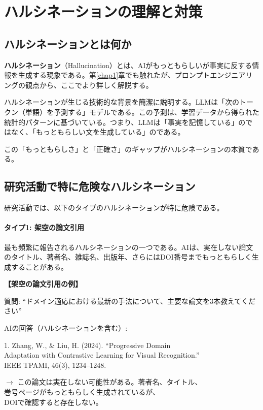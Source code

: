\section{ハルシネーションの理解と対策}
\label{sec:2.5}

\subsection{ハルシネーションとは何か}

\textbf{ハルシネーション}（Hallucination）とは、AIがもっともらしいが事実に反する情報を生成する現象である。第\ref{chap1}章でも触れたが、プロンプトエンジニアリングの観点から、ここでより詳しく解説する。

ハルシネーションが生じる技術的な背景を簡潔に説明する。LLMは「次のトークン（単語）を予測する」モデルである。この予測は、学習データから得られた統計的パターンに基づいている。つまり、LLMは「事実を記憶している」のではなく、「もっともらしい文を生成している」のである。

この「もっともらしさ」と「正確さ」のギャップがハルシネーションの本質である。

\subsection{研究活動で特に危険なハルシネーション}

研究活動では、以下のタイプのハルシネーションが特に危険である。

\paragraph{タイプ1: 架空の論文引用}
最も頻繁に報告されるハルシネーションの一つである。AIは、実在しない論文のタイトル、著者名、雑誌名、出版年、さらにはDOI番号までもっともらしく生成することがある。

\begin{promptbox}
\textbf{【架空の論文引用の例】}

質問: ``ドメイン適応における最新の手法について、主要な論文を3本教えてください''

AIの回答（ハルシネーションを含む）:

1. Zhang, W., \& Liu, H. (2024). ``Progressive Domain\\
Adaptation with Contrastive Learning for Visual Recognition.''\\
IEEE TPAMI, 46(3), 1234--1248.

$\rightarrow$ この論文は実在しない可能性がある。著者名、タイトル、\\
巻号ページがもっともらしく生成されているが、\\
DOIで確認すると存在しない。
\end{promptbox}

